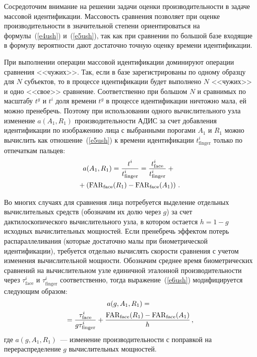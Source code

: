 \begin{multicols}{2}
     Сосредоточим внимание на решении задачи оценки производительности в задаче
массовой идентификации. Массовость сравнения позволяет при оценке
производительности в значительной степени ориентироваться на
формулы~(\ref{e4ush}) и~(\ref{e5ush}), так как при сравнении по большой базе
входящие в формулу вероятности дают достаточно точную оценку времени
идентификации.

      При выполнении операции массовой идентификации доминируют операции
сравнения <<чужих>>. Так, если в базе зарегистрированы по одному образцу для $N$
субъектов, то в процессе идентификации будет выполнено $N$ <<чужих>> и одно <<свое>>
сравнение. Соответственно при большом $N$ и сравнимых по масштабу $t^g$ и $t^i$
доля времени $t^g$ в процессе идентификации ничтожно мала, ей можно пренебречь.
Поэтому при использовании одного вычислительного узла изменение $a(A_1,R_1)$
производительности АДИС за счет добавления идентификации по изображению лица с
выбранными порогами $A_1$ и $R_1$ можно вычислить как 
отношение~(\ref{e5ush}) к времени идентификации $t^i_{\mathrm{finger}}$ только по
отпечаткам пальцев:
     \begin{multline}
     a(A_1,R_1) = \displaystyle\frac{\displaystyle t^i\mathstrut}{\displaystyle t^i_{\mathrm{finger}}\mathstrut}
=\displaystyle\frac{\displaystyle t^i_{\mathrm{face}}\mathstrut}{\displaystyle t^i_{\mathrm{finger}}\mathstrut}+{}\\
     {}+ \left ( \mathrm{FAR}_{\mathrm{face}}(R_1) -
\mathrm{FAR}_{\mathrm{face}}(A_1)\right )\,.
     \label{e6ush}
     \end{multline}

     Во многих случаях для сравнения лица потребуется выделение отдельных
вычислительных средств (обозначим их долю через $g$) за счет дактилоскопического
вычислительного узла, в котором остает\-ся $h =1-g$ исходных вычислительных
мощ\-ностей. Если пренебречь эффектом потерь рас\-па\-рал\-ле\-ли\-ва\-ния (которые достаточно
малы при биометрической идентификации), требуется отдельно вы\-чис\-лять скорости
сравнения с учетом изменения %
вычис\-ли\-тель\-ной мощности. Обозначим среднее время
биометрических сравнений на вычислительном узле единичной эталонной
про\-из\-во\-ди\-тель\-ности через $\tau^i_{\mathrm{face}}$ и $\tau^i_{\mathrm{finger}}$
соответственно, тогда выражение~(\ref{e6ush}) модифицируется следующим образом:
     \begin{multline}
     a(g,A_1,R_1) ={}\\
     {}= \displaystyle\frac{\displaystyle \tau^i_{\mathrm{face}}\mathstrut}{\displaystyle g\tau^i_{\mathrm{finger}}\mathstrut}+
     \displaystyle\frac{\displaystyle  \mathrm{FAR}_{\mathrm{face}}(R_1) -
\mathrm{FAR}_{\mathrm{face}}(A_1)\mathstrut}{\displaystyle h\mathstrut}\,,
     \label{e7ush}
     \end{multline}
где $ a(g,A_1,R_1)$~--- изменение производительности с поправкой на
перераспределение  $g$  вычислительных мощностей.


\end{multicols}

